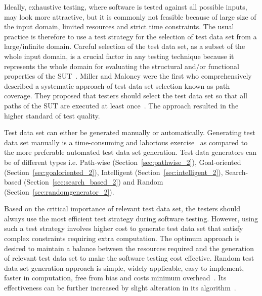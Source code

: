 Ideally, exhaustive testing, where software is tested against all possible inputs, may look more attractive, but it is commonly not feasible because of large size of the input domain, limited resources and strict time constraints. The usual practice is therefore to use a test strategy for the selection of test data set from a large/infinite domain. Careful selection of the test data set, as a subset of the whole input domain, is a crucial factor in any testing technique because it represents the whole domain for evaluating the structural and/or functional properties of the SUT~\cite{howden1986functional, mccabe1983structured}. Miller and Maloney were the first who comprehensively described a systematic approach of test data set selection known as path coverage. They proposed that testers should select the test data set so that all paths of the SUT are executed at least once~\cite{miller1963systematic}. The approach resulted in the higher standard of test quality. %

Test data set can either be generated manually or automatically. Generating test data set manually is a time-consuming and laborious exercise~\cite{korel1990automated} as compared to the more preferable automated test data set generation. Test data generators can be of different types i.e. Path-wise (Section~\ref{sec:pathwise_2}), Goal-oriented (Section~\ref{sec:goaloriented_2}), Intelligent (Section~\ref{sec:intelligent_2}), Search-based (Section~\ref{sec:search_based_2}) and Random (Section~\ref{sec:randomgenerator_2}).

Based on the critical importance of relevant test data set, the testers should always use the most efficient test strategy during software testing. However, using such a test strategy involves higher cost to generate test data set that satisfy complex constraints requiring extra computation. The optimum approach is desired to maintain a balance between the resources required and the generation of relevant test data set to make the software testing cost effective. Random test data set generation approach is simple, widely applicable, easy to implement, faster in computation, free from bias and costs minimum overhead~\cite{ciupa2007experimental}. Its effectiveness can be further increased by slight alteration in its algorithm~\cite{chen2005adaptive}.



